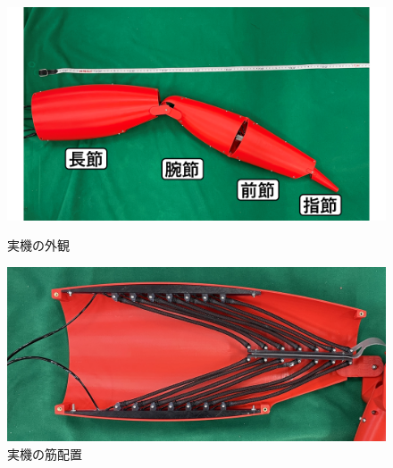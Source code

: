 \documentclass{jarticle}
\begin{document}
\begin{figure}[t]
  \begin{minipage}[b]{0.5\columnwidth}
    \centering
    \includegraphics[scale=0.1]{image/jikki.png}
    \vspace{-2mm}
    \caption{実機の外観}
    \label{fig:jikki}
  \end{minipage}
  \hspace{0.04\columnwidth}
  \begin{minipage}[b]{0.4\columnwidth}
    \centering
    \includegraphics[scale=0.028]{image/crabmuscle.jpg}
    \vspace{-4mm}
    \caption{実機の筋配置}
    \label{fig:muscle}
  \end{minipage}
\end{figure}
\begin{table}[t]
  \centering
  \vspace{-2mm}
  \caption{実際の蟹と実機の可動域比較}
  \vspace{1mm}
  \label{tab:kadouiki}
\end{table}
\end{document}
